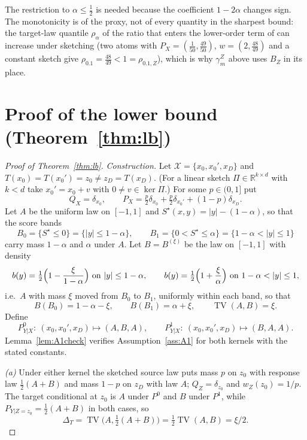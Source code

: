 \documentclass[11pt,a4paper]{article}
\newcommand{\PX}{P_X}
\newcommand{\QX}{Q_X}
\newcommand{\R}{\mathbb{R}}
\newcommand{\TV}{\operatorname{TV}}
\theoremstyle{plain}
\theoremstyle{definition}
\theoremstyle{remark}
\begin{document}
The restriction to $\alpha\le\tfrac12$ is needed because the coefficient $1-2\alpha$ changes sign. The monotonicity is of the proxy, not of every quantity in the sharpest bound: the target-law quantile $\rho_\alpha$ of the ratio that enters the lower-order term of \cite[eq.\ (9)]{pournaderi2026} can increase under sketching (two atoms with $\PX=(\tfrac1{50},\tfrac{49}{50})$, $w=(2,\tfrac{48}{49})$ and a constant sketch give $\rho_{0.1}=\tfrac{48}{49}<1=\rho_{0.1,Z}$), which is why $\gamma^Z_m$ above uses $B_Z$ in its place.

\section{Proof of the lower bound (Theorem~\ref{thm:lb})}\label{app:lb}

\begin{proof}[Proof of Theorem~\ref{thm:lb}]
\emph{Construction.} Let $\mathcal X=\{x_0,x_0',x_D\}$ and $T(x_0)=T(x_0')=z_0\ne z_D=T(x_D)$. (For a linear sketch $\Pi\in\R^{k\times d}$ with $k<d$ take $x_0'=x_0+v$ with $0\ne v\in\ker\Pi$.) For some $p\in(0,1]$ put
\[
\QX=\delta_{x_0},\qquad \PX=\tfrac p2\delta_{x_0}+\tfrac p2\delta_{x_0'}+(1-p)\delta_{x_D}.
\]
Let $A$ be the uniform law on $[-1,1]$ and $S^\star(x,y)=|y|-(1-\alpha)$, so that the score bands
\[
B_0=\{S^\star\le0\}=\{|y|\le1-\alpha\},\qquad B_1=\{0<S^\star\le\alpha\}=\{1-\alpha<|y|\le1\}
\]
carry mass $1-\alpha$ and $\alpha$ under $A$. Let $B=B^{(\xi)}$ be the law on $[-1,1]$ with density
\[
b(y)=\tfrac12\Bigl(1-\frac{\xi}{1-\alpha}\Bigr)\ \text{on } |y|\le1-\alpha,\qquad
b(y)=\tfrac12\Bigl(1+\frac{\xi}{\alpha}\Bigr)\ \text{on } 1-\alpha<|y|\le1,
\]
i.e.\ $A$ with mass $\xi$ moved from $B_0$ to $B_1$, uniformly within each band, so that
\[
B(B_0)=1-\alpha-\xi,\qquad B(B_1)=\alpha+\xi,\qquad \TV(A,B)=\xi .
\]
Define
\[
P^0_{Y|X}:\ (x_0,x_0',x_D)\mapsto(A,B,A),\qquad P^1_{Y|X}:\ (x_0,x_0',x_D)\mapsto(B,A,A).
\]
Lemma~\ref{lem:A1check} verifies Assumption~\ref{ass:A1} for both kernels with the stated constants.

\emph{(a)} Under either kernel the sketched source law puts mass $p$ on $z_0$ with response law $\tfrac12(A+B)$ and mass $1-p$ on $z_D$ with law $A$; $Q_Z=\delta_{z_0}$ and $w_Z(z_0)=1/p$. The target conditional at $z_0$ is $A$ under $P^0$ and $B$ under $P^1$, while $P_{Y|Z=z_0}=\tfrac12(A+B)$ in both cases, so
\[
\Delta_T=\TV\bigl(A,\tfrac12(A+B)\bigr)=\tfrac12\TV(A,B)=\xi/2 .
\]


\end{proof}
\end{document}
